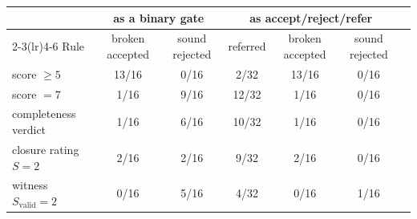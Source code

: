 \begin{tabular}{@{}lcccccc@{}}
\toprule
 & \multicolumn{2}{c}{as a binary gate} & \multicolumn{3}{c}{as accept/reject/refer} \\
\cmidrule(lr){2-3}\cmidrule(lr){4-6}
Rule & broken accepted & sound rejected & referred & broken accepted & sound rejected \\
\midrule
score $\ge 5$ & 13/16 & 0/16 & 2/32 & 13/16 & 0/16 \\
score $=7$ & 1/16 & 9/16 & 12/32 & 1/16 & 0/16 \\
completeness verdict & 1/16 & 6/16 & 10/32 & 1/16 & 0/16 \\
closure rating $S{=}2$ & 2/16 & 2/16 & 9/32 & 2/16 & 0/16 \\
witness $S_{\mathrm{valid}}{=}2$ & 0/16 & 5/16 & 4/32 & 0/16 & 1/16 \\
\bottomrule
\end{tabular}

